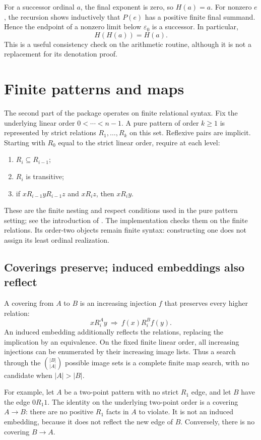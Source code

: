 \documentclass[11pt]{article}
\begin{document}
For a successor ordinal $a$, the final exponent is zero, so $H(a)=a$.
For nonzero $e$, the recursion shows inductively that $P(e)$ has a
positive finite final summand. Hence the endpoint of a nonzero limit
below $\varepsilon_0$ is a successor. In particular,
\[
 H(H(a))=H(a).
\]
This is a useful consistency check on the arithmetic routine, although
it is not a replacement for its denotation proof.

\section{Finite patterns and maps}

The second part of the package operates on finite relational syntax.
Fix the underlying linear order $0<\cdots<n-1$. A pure pattern of order
$k\geq1$ is represented by strict relations $R_1,\ldots,R_k$ on this
set. Reflexive pairs are implicit. Starting with $R_0$ equal to the
strict linear order, require at each level:
\begin{enumerate}
 \item $R_i\subseteq R_{i-1}$;
 \item $R_i$ is transitive;
 \item if $xR_{i-1}yR_{i-1}z$ and $xR_i z$, then $xR_i y$.
\end{enumerate}
These are the finite nesting and respect conditions used in the pure
pattern setting; see the introduction of \cite{Wilken2021}. The
implementation checks them on the finite relations. Its order-two
objects remain finite syntax: constructing one does not assign its
least ordinal realization.

\subsection{Coverings preserve; induced embeddings also reflect}

A covering from $A$ to $B$ is an increasing injection $f$ that preserves
every higher relation:
\[
 xR_i^A y\ \Longrightarrow\ f(x)R_i^B f(y).
\]
An induced embedding additionally reflects the relations, replacing the
implication by an equivalence. On the fixed finite linear order, all
increasing injections can be enumerated by their increasing image lists.
Thus a search through the $\binom{|B|}{|A|}$ possible image sets is a
complete finite map search, with no candidate when $|A|>|B|$.

For example, let $A$ be a two-point pattern with no strict $R_1$ edge,
and let $B$ have the edge $0R_1 1$. The identity on the underlying
two-point order is a covering $A\to B$: there are no positive $R_1$
facts in $A$ to violate. It is not an induced embedding, because it
does not reflect the new edge of $B$. Conversely, there is no covering
$B\to A$.
\end{document}
